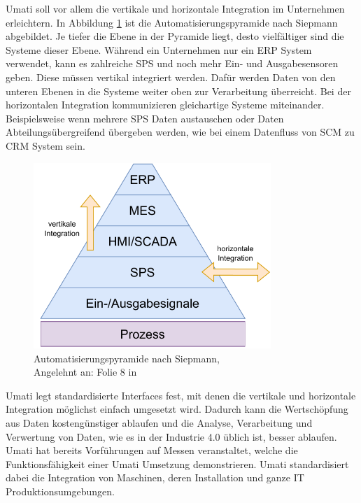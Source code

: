 \documentclass[a4paper, 12pt, oneside]{scrbook}
\begin{document}
		Umati soll vor allem die vertikale und horizontale Integration im Unternehmen erleichtern. In Abbildung \ref{fig:Automatisierungspyramide} ist die Automatisierungspyramide nach Siepmann abgebildet. Je tiefer die Ebene in der Pyramide liegt, desto vielfältiger sind die Systeme dieser Ebene. Während ein Unternehmen nur ein \ac{ERP} System verwendet, kann es zahlreiche SPS und noch mehr Ein- und Ausgabesensoren geben. Diese müssen vertikal integriert werden. Dafür werden Daten von den unteren Ebenen in die Systeme weiter oben zur Verarbeitung überreicht. Bei der horizontalen Integration kommunizieren gleichartige Systeme miteinander. Beispielsweise wenn mehrere SPS Daten austauschen oder Daten Abteilungsübergreifend übergeben werden, wie bei einem Datenfluss von SCM zu CRM System sein. 
		
		\begin{figure}[H]
			\centering
			\includegraphics[width=0.8\textwidth]{res/diagramms/Automatisierungspyramide.pdf}
			\caption{Automatisierungspyramide nach Siepmann, \\ Angelehnt an: Folie 8 in \cite{mielebacher_verteilte_2021}} 
			\label{fig:Automatisierungspyramide}
		\end{figure}
		
		Umati legt standardisierte Interfaces fest, mit denen die vertikale und horizontale Integration möglichst einfach umgesetzt wird. Dadurch kann die Wertschöpfung aus Daten kostengünstiger ablaufen und die Analyse, Verarbeitung und Verwertung von Daten, wie es in der Industrie 4.0 üblich ist, besser ablaufen. Umati hat bereits Vorführungen auf Messen veranstaltet, welche die Funktionsfähigkeit einer Umati Umsetzung demonstrieren. Umati standardisiert dabei die Integration von Maschinen, deren Installation und ganze IT Produktionsumgebungen. \cite{noauthor_about_nodate}
		
\end{document}
